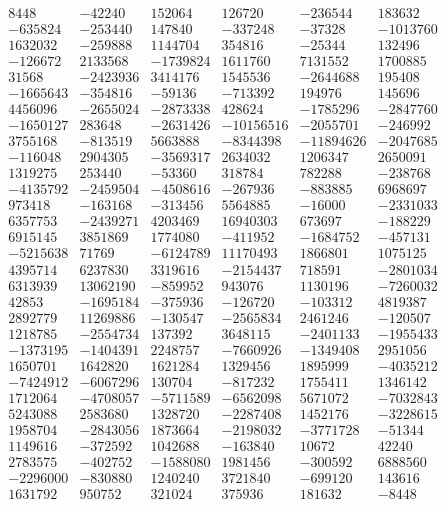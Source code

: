 \[
\begin{array}{rrrrrr}
8448 & -42240 & 152064 & 126720 & -236544 & 183632 \\
-635824 & -253440 & 147840 & -337248 & -37328 & -1013760 \\
1632032 & -259888 & 1144704 & 354816 & -25344 & 132496 \\
-126672 & 2133568 & -1739824 & 1611760 & 7131552 & 1700885 \\
31568 & -2423936 & 3414176 & 1545536 & -2644688 & 195408 \\
-1665643 & -354816 & -59136 & -713392 & 194976 & 145696 \\
4456096 & -2655024 & -2873338 & 428624 & -1785296 & -2847760 \\
-1650127 & 283648 & -2631426 & -10156516 & -2055701 & -246992 \\
3755168 & -813519 & 5663888 & -8344398 & -11894626 & -2047685 \\
-116048 & 2904305 & -3569317 & 2634032 & 1206347 & 2650091 \\
1319275 & 253440 & -53360 & 318784 & 782288 & -238768 \\
-4135792 & -2459504 & -4508616 & -267936 & -883885 & 6968697 \\
973418 & -163168 & -313456 & 5564885 & -16000 & -2331033 \\
6357753 & -2439271 & 4203469 & 16940303 & 673697 & -188229 \\
6915145 & 3851869 & 1774080 & -411952 & -1684752 & -457131 \\
-5215638 & 71769 & -6124789 & 11170493 & 1866801 & 1075125 \\
4395714 & 6237830 & 3319616 & -2154437 & 718591 & -2801034 \\
6313939 & 13062190 & -859952 & 943076 & 1130196 & -7260032 \\
42853 & -1695184 & -375936 & -126720 & -103312 & 4819387 \\
2892779 & 11269886 & -130547 & -2565834 & 2461246 & -120507 \\
1218785 & -2554734 & 137392 & 3648115 & -2401133 & -1955433 \\
-1373195 & -1404391 & 2248757 & -7660926 & -1349408 & 2951056 \\
1650701 & 1642820 & 1621284 & 1329456 & 1895999 & -4035212 \\
-7424912 & -6067296 & 130704 & -817232 & 1755411 & 1346142 \\
1712064 & -4708057 & -5711589 & -6562098 & 5671072 & -7032843 \\
5243088 & 2583680 & 1328720 & -2287408 & 1452176 & -3228615 \\
1958704 & -2843056 & 1873664 & -2198032 & -3771728 & -51344 \\
1149616 & -372592 & 1042688 & -163840 & 10672 & 42240 \\
2783575 & -402752 & -1588080 & 1981456 & -300592 & 6888560 \\
-2296000 & -830880 & 1240240 & 3721840 & -699120 & 143616 \\
1631792 & 950752 & 321024 & 375936 & 181632 & -8448 \\
\end{array}
\]

